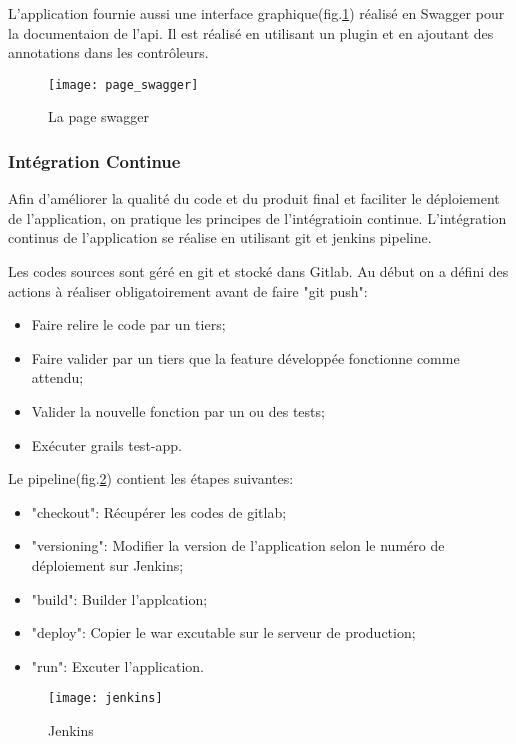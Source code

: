 L'application fournie aussi une interface graphique(fig.\ref{fig:page_swagger}) réalisé en Swagger pour la documentaion de l'api.
Il est réalisé en utilisant un plugin et en ajoutant des annotations dans les contrôleurs.

\begin{figure}[ht]
 \centering
 \texttt{[image: page\_swagger]}
 \caption{La page swagger}
 \label{fig:page_swagger}
\end{figure}

\clearpage

\subsubsection{Intégration Continue}
Afin d'améliorer la qualité du code et du produit final et faciliter le déploiement de l'application, on pratique les principes de l'intégratioin continue.
L'intégration continus de l'application se réalise en utilisant git et jenkins pipeline.

Les codes sources sont géré en git et stocké dans Gitlab.
Au début on a défini des actions à réaliser obligatoirement avant de faire "git push":
\begin{itemize}
 \item Faire relire le code par un tiers;
 \item Faire valider par un tiers que la feature développée fonctionne comme attendu;
 \item Valider la nouvelle fonction par un ou des tests;
 \item Exécuter grails test-app.
\end{itemize}

Le pipeline(fig.\ref{fig:jenkins}) contient les étapes suivantes:
\begin{itemize}
 \item "checkout": Récupérer les codes de gitlab;
 \item "versioning": Modifier la version de l'application selon le numéro de déploiement sur Jenkins;
 \item "build": Builder l'applcation;
 \item "deploy": Copier le war excutable sur le serveur de production;
 \item "run": Excuter l'application.
\end{itemize}

\begin{figure}[ht]
 \centering
 \texttt{[image: jenkins]}
 \caption{Jenkins}
 \label{fig:jenkins}
\end{figure}

